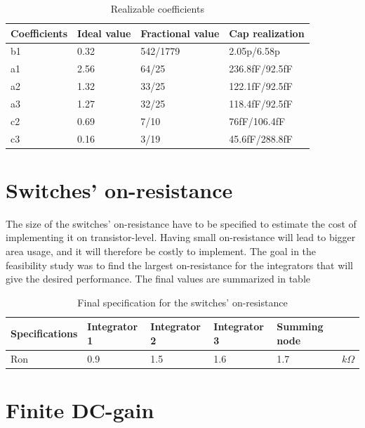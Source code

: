 \begin{table}[h!]
\centering
\caption{Realizable coefficients}
\label{RC}
\begin{tabular}{|l|l|l|l|}
\hline
Coefficients & Ideal value & Fractional value & Cap realization \\ \hline
b1           & 0.32        & 542/1779         & 2.05p/6.58p     \\ \hline
a1           & 2.56        & 64/25            & 236.8fF/92.5fF \\ \hline
a2           & 1.32        & 33/25            & 122.1fF/92.5fF  \\ \hline
a3           & 1.27        & 32/25            & 118.4fF/92.5fF  \\ \hline
c2           & 0.69        & 7/10             & 76fF/106.4fF \\ \hline
c3           & 0.16        & 3/19             & 45.6fF/288.8fF   \\ \hline
\end{tabular}
\end{table}

\section{Switches' on-resistance}\label{on-resistance}
The size of the switches' on-resistance have to be specified to estimate the cost of implementing it on transistor-level. Having small on-resistance will lead to bigger area usage, and it will therefore be costly to implement. The goal in the feasibility study was to find the largest on-resistance for the integrators that will give the desired performance. The final values are summarized in table  

\begin{table}[H]
\centering
\caption{Final specification for the switches' on-resistance}
\label{spec_res}
\begin{tabular}{|l|l|l|l|l|l|}
\hline
Specifications & Integrator 1 & Integrator 2 & Integrator 3 & Summing node &    \\ \hline
Ron            & 0.9            & 1.5          & 1.6          & 1.7          & $k\Omega$ \\ \hline
\end{tabular}
\end{table}

\section{Finite DC-gain}

